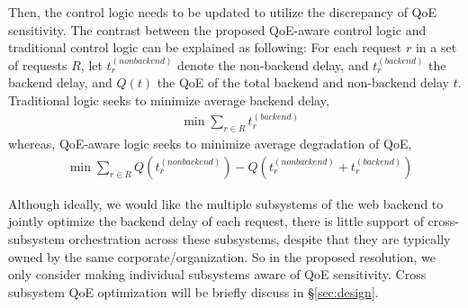 Then, the control logic needs to be updated to utilize the discrepancy of QoE sensitivity.
The contrast between the proposed QoE-aware control logic and traditional control logic can be explained as following: 
For each request $r$ in a set of requests $R$, let $t_{r}^{(nonbackend)}$ denote the non-backend delay, and $t_{r}^{(backend)}$ the backend delay, and $Q(t)$ the QoE of the total backend and non-backend delay $t$.
Traditional logic seeks to minimize average backend delay, \ie
\begin{align}
& \min \sum_{r\in R} t_{r}^{(backend)} \label{eq:old}
\end{align}
whereas, QoE-aware logic seeks to minimize average degradation of QoE, \ie
\begin{align}
& \min \sum_{r\in R} Q\left(t_{r}^{(nonbackend)}\right)-Q\left(t_{r}^{(nonbackend)}+t_{r}^{(backend)}\right) \label{eq:new}
\end{align}

Although ideally, we would like the multiple subsystems of the web backend to jointly optimize the backend delay of each request, there is little support of cross-subsystem orchestration across these subsystems, despite that they are typically owned by the same corporate/organization. So in  the proposed resolution, we only consider making individual subsystems aware of QoE sensitivity. Cross subsystem QoE optimization will be briefly discuss in \S\ref{sec:design}.


